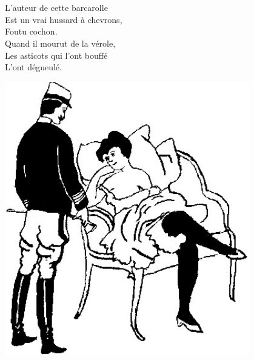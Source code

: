 \\\\L'auteur de cette barcarolle
\\Est un vrai hussard à chevrons,
\\Foutu cochon.
\\Quand il mourut de la vérole,
\\Les asticots qui l'ont bouffé
\\L'ont dégueulé.
\begin{center}
\includegraphics[width=0.8\textwidth]{images/hussard.jpg}
\end{center}

\breakpage